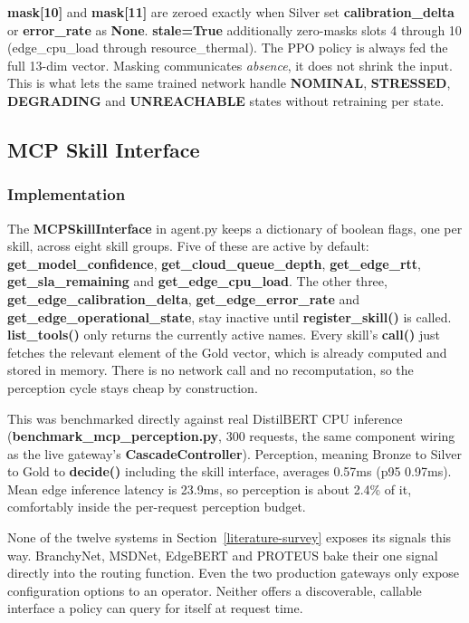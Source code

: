 \textbf{mask{[}10{]}} and \textbf{mask{[}11{]}} are zeroed
exactly when Silver set \textbf{calibration\_delta} or
\textbf{error\_rate} as \textbf{None}. \textbf{stale=True} additionally
zero-masks slots 4 through 10 (edge\_cpu\_load through
resource\_thermal). The PPO policy is always fed the full 13-dim
vector. Masking communicates \emph{absence}, it does not shrink the input.
This is what lets the same trained network handle \textbf{NOMINAL},
\textbf{STRESSED}, \textbf{DEGRADING} and \textbf{UNREACHABLE} states
without retraining per state.

\hypertarget{mcp-skill-interface}{%
\subsection{MCP Skill Interface}\label{mcp-skill-interface}}

\hypertarget{implementation-1}{%
\subsubsection{Implementation}\label{implementation-1}}

The \textbf{MCPSkillInterface} in agent.py keeps a dictionary of
boolean flags, one per skill, across eight skill groups. Five of these
are active by default: \textbf{get\_model\_confidence},
\textbf{get\_cloud\_queue\_depth}, \textbf{get\_edge\_rtt},
\textbf{get\_sla\_remaining} and \textbf{get\_edge\_cpu\_load}. The
other three, \textbf{get\_edge\_calibration\_delta},
\textbf{get\_edge\_error\_rate} and
\textbf{get\_edge\_operational\_state}, stay inactive until
\textbf{register\_skill()} is called. \textbf{list\_tools()} only
returns the currently active names. Every skill's \textbf{call()} just
fetches the relevant element of the Gold vector, which is already
computed and stored in memory. There is no network call and no
recomputation, so the perception cycle stays cheap by construction.

This was benchmarked directly against real DistilBERT CPU inference
(\textbf{benchmark\_mcp\_perception.py}, 300 requests, the same
component wiring as the live gateway's \textbf{CascadeController}).
Perception, meaning Bronze to Silver to Gold to \textbf{decide()}
including the skill interface, averages 0.57ms (p95 0.97ms). Mean edge
inference latency is 23.9ms, so perception is about 2.4\% of it,
comfortably inside the per-request perception budget.

None of the twelve systems in Section~\ref{literature-survey} exposes its signals this way.
BranchyNet, MSDNet, EdgeBERT and PROTEUS bake their one signal directly
into the routing function. Even the two production gateways only
expose configuration options to an operator. Neither offers a
discoverable, callable interface a policy can query for itself at
request time.

